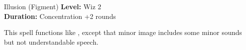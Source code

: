 {Illusion (Figment)}
{
	\textbf{Level:}
	Wiz 2\\
	\textbf{Duration:}
	Concentration +2 rounds\\
}
{
	This spell functions like , except that minor image includes some minor sounds but not understandable speech.

}
